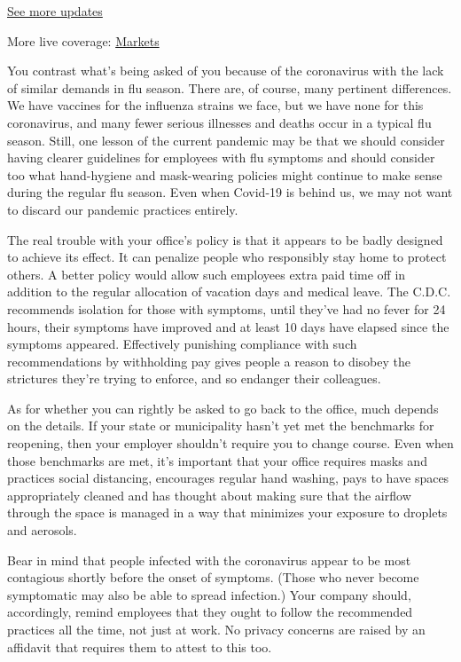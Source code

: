 \href{https://www.nytimes3xbfgragh.onion/2020/09/08/world/covid-19-coronavirus.html?action=click\&pgtype=Article\&state=default\&region=MAIN_CONTENT_1\&context=storylines_live_updates}{See
more updates}

More live coverage:
\href{https://www.nytimes3xbfgragh.onion/live/2020/09/08/business/stock-market-today-coronavirus?action=click\&pgtype=Article\&state=default\&region=MAIN_CONTENT_1\&context=storylines_live_updates}{Markets}

You contrast what's being asked of you because of the coronavirus with
the lack of similar demands in flu season. There are, of course, many
pertinent differences. We have vaccines for the influenza strains we
face, but we have none for this coronavirus, and many fewer serious
illnesses and deaths occur in a typical flu season. Still, one lesson of
the current pandemic may be that we should consider having clearer
guidelines for employees with flu symptoms and should consider too what
hand-hygiene and mask-wearing policies might continue to make sense
during the regular flu season. Even when Covid-19 is behind us, we may
not want to discard our pandemic practices entirely.

The real trouble with your office's policy is that it appears to be
badly designed to achieve its effect. It can penalize people who
responsibly stay home to protect others. A better policy would allow
such employees extra paid time off in addition to the regular allocation
of vacation days and medical leave. The C.D.C. recommends isolation for
those with symptoms, until they've had no fever for 24 hours, their
symptoms have improved and at least 10 days have elapsed since the
symptoms appeared. Effectively punishing compliance with such
recommendations by withholding pay gives people a reason to disobey the
strictures they're trying to enforce, and so endanger their colleagues.

As for whether you can rightly be asked to go back to the office, much
depends on the details. If your state or municipality hasn't yet met the
benchmarks for reopening, then your employer shouldn't require you to
change course. Even when those benchmarks are met, it's important that
your office requires masks and practices social distancing, encourages
regular hand washing, pays to have spaces appropriately cleaned and has
thought about making sure that the airflow through the space is managed
in a way that minimizes your exposure to droplets and aerosols.

Bear in mind that people infected with the coronavirus appear to be most
contagious shortly before the onset of symptoms. (Those who never become
symptomatic may also be able to spread infection.) Your company should,
accordingly, remind employees that they ought to follow the recommended
practices all the time, not just at work. No privacy concerns are raised
by an affidavit that requires them to attest to this too.

